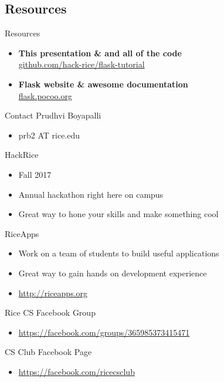 \documentclass{beamer}
\begin{document}
\subsection{Resources}
	\begin{frame}[t]{Resources}
		\begin{itemize}
			\item{
				\textbf{This presentation \& and all of the code}\\
				\indent \url{github.com/hack-rice/flask-tutorial}
			}
			\item{
				\textbf{Flask website \& awesome documentation}\\
				\indent \url{flask.pocoo.org}
			}
		\end{itemize}
	\end{frame}

	\begin{frame}[t]{Contact}
		Prudhvi Boyapalli
		\begin{itemize}
			\item{prb2 AT rice.edu}
		\end{itemize}
		\pause

		HackRice
		\begin{itemize}
			\item{Fall 2017}
			\item{Annual hackathon right here on campus}
			\item{Great way to hone your skills and make something cool}
		\end{itemize}
		\pause

		RiceApps
		\begin{itemize}
			\item{Work on a team of students to build useful applications}
			\item{Great way to gain hands on development experience}
			\item{\url{http://riceapps.org}}
		\end{itemize}
		\pause

		Rice CS Facebook Group
		\begin{itemize}
			\item{\url{https://facebook.com/groups/365985373415471}}
		\end{itemize}

		CS Club Facebook Page
		\begin{itemize}
			\item{\url{https://facebook.com/ricecsclub}}
		\end{itemize}
	\end{frame}
\end{document}

